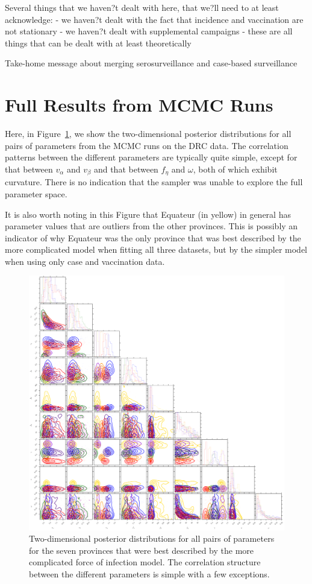 \documentclass[nofootinbib,aps,pre,twocolumn,superscriptaddress,showkeys,showpacs]{revtex4-1}
\begin{document}
Several things that we haven?t dealt with here, that we?ll need to at least acknowledge:
	- we haven?t dealt with the fact that incidence and vaccination are not stationary
	- we haven?t dealt with supplemental campaigns
	- these are all things that can be dealt with at least theoretically

Take-home message about merging serosurveillance and case-based surveillance

\appendix*
    \section{Full Results from MCMC Runs}
Here, in Figure~\ref{fig:cornerplot}, we show the two-dimensional posterior distributions for all pairs of parameters from the MCMC runs on the DRC data. The correlation patterns between the different parameters are typically quite simple, except for that between $v_\alpha$ and $v_\beta$ and that between $f_\eta$ and $\omega$, both of which exhibit curvature. There is no indication that the sampler was unable to explore the full parameter space.

It is also worth noting in this Figure that Equateur (in yellow) in general has parameter values that are outliers from the other provinces. This is possibly an indicator of why Equateur was the only province that was best described by the more complicated model when fitting all three datasets, but by the simpler model when using only case and vaccination data.

\begin{figure}
\includegraphics[width=\textwidth,angle=0]{figures/cornerplot.png}
\caption{\label{fig:cornerplot}  Two-dimensional posterior distributions for all pairs of parameters for the seven provinces that were best described by the more complicated force of infection model. The correlation structure between the different parameters is simple with a few exceptions.}
\end{figure}




\end{document}
